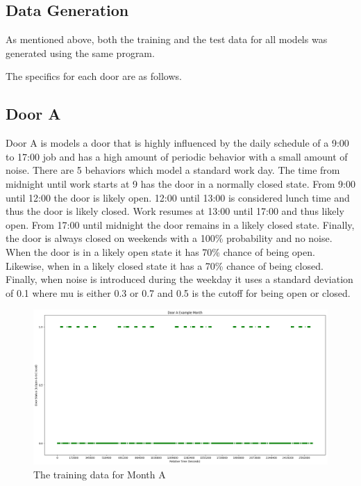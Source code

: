   \subsection{ Data Generation }

  As mentioned above, both the training and the test data for all models was
  generated using the same program.

  The specifics for each door are as follows.

  \subsection{ Door A }

  Door A is models a door that is highly influenced by the daily schedule of a
  9:00 to 17:00 job and has a high amount of periodic behavior with a small
  amount of noise.  There are 5 behaviors which model a standard work day. The
  time from midnight until work starts at 9 has the door in a normally closed
  state.  From 9:00 until 12:00 the door is likely open. 12:00 until 13:00 is
  considered lunch time and thus the door is likely closed. Work resumes at
  13:00 until 17:00 and thus likely open. From 17:00 until midnight
  the door remains in a likely closed state. Finally, the door is always
  closed on weekends with a 100\% probability and no noise. \\

  When the door is in a likely open state it has 70\% chance of being open.
  Likewise, when in a likely closed state it has a 70\% chance of being closed.
  Finally, when noise is introduced during the weekday it uses a standard deviation
  of 0.1 where mu is either 0.3 or 0.7 and 0.5 is the cutoff for being open or
  closed. \\

  \begin{figure}[!htb]
    \centering
    \includegraphics[width=\linewidth]{images/Door_A_Example_Month.png}
    \caption{The training data for Month A}
    \label{figure:Door A Training Month}
  \end{figure}

